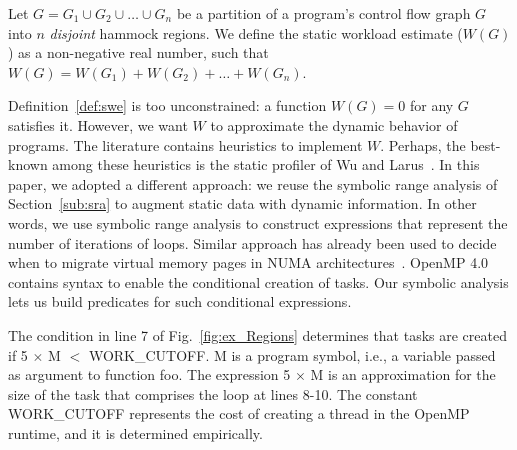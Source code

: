\documentclass[sigplan,10pt,review,anonymous]{acmart}
\begin{document}
\begin{definition}
\label{def:swe}
Let $G = G_1 \cup G_2 \cup \ldots \cup G_n$ be a partition of a program's control
flow graph $G$ into $n$ {\em disjoint} hammock regions.
We define the static workload estimate ($W(G)$) as a non-negative real number,
such that $W(G) = W(G_1) + W(G_2) + \ldots + W(G_n)$.
\end{definition}

Definition~\ref{def:swe} is too unconstrained: a function $W(G) = 0$ for any $G$
satisfies it.
However, we want $W$ to approximate the dynamic behavior of programs.
The literature contains heuristics to implement $W$.
Perhaps, the best-known among these heuristics is the static profiler of
Wu and Larus~\cite{Wu94}.
In this paper, we adopted a different approach: we reuse the symbolic range
analysis of Section~\ref{sub:sra} to augment static data with dynamic information.
In other words, we use symbolic range analysis to construct expressions that
represent the number of iterations of loops.
Similar approach has already been used to decide when to migrate virtual memory
pages in NUMA architectures~\cite{Piccoli14}.
OpenMP 4.0 contains syntax to enable the conditional creation of tasks.
Our symbolic analysis lets us build predicates for such conditional expressions.

\begin{example}
\label{ex:cond_task}
The condition in line 7 of Fig.~\ref{fig:ex_Regions} determines that tasks are
created if \textsf{5 $\times$ M $<$ WORK\_CUTOFF}.
\textsf{M} is a program symbol, i.e., a variable passed as argument to
function \textsf{foo}.
The expression \textsf{5 $\times$ M} is an approximation for the size of the
task that comprises the loop at lines 8-10.
The constant \textsf{WORK\_CUTOFF} represents the cost of creating a thread
in the OpenMP runtime, and it is determined empirically.
\end{example}
\end{document}

